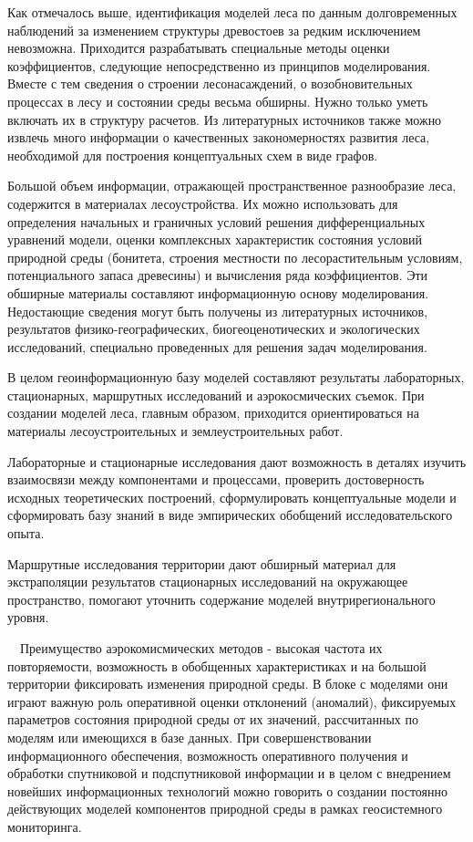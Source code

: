 \documentclass{report}
\begin{document}
Как отмечалось выше, идентификация моделей леса по данным долговременных наблюдений за изменением структуры древостоев
за редким исключением невозможна. Приходится разрабатывать специальные методы оценки коэффициентов, следующие
непосред\-ственно из принципов моделирования. Вместе с тем сведения о строении лесонасаждений, о возобновительных
процессах в лесу и состоянии среды весьма обширны. Нужно только уметь включать их в структуру расчетов. Из литературных
источников также мож\-но извлечь много информации о качественных закономерностях развития леса, необходимой для
построения концептуальных схем в виде графов.

Большой объем информации, отражающей пространственное разнообразие леса, содержится в материалах лесоустройства. Их
можно использовать для определения начальных и граничных условий решения дифференциальных уравнений мо\-дели, оценки
комплексных характеристик состояния условий при\-родной среды (бонитета, строения местности по лесорастительным
условиям, потенциального запаса древесины) и вычисления ряда коэффициентов. Эти обширные материалы составляют
информаци\-онную основу моделирования. Недостающие сведения могут быть получены из литературных источников, результатов
физико-географических, биогеоценотических и экологических исследований, специально проведенных для решения задач
моделирования.

В целом геоинформационную  базу  моделей  составляют  результаты лабораторных,  стационарных,  маршрутных  исследований 
и аэрокосмических  съемок.  При  создании  моделей  леса,  главным образом, приходится ориентироваться на материалы
лесоустроительных и землеустроительных работ.

Лабораторные и стационарные исследования дают  возможность  в деталях  изучить  взаимосвязи  между  компонентами  и 
процессами, проверить  достоверность  исходных  теоретических  построений, сформулировать концептуальные модели и
сформировать базу знаний в виде эмпирических обобщений исследовательского опыта. 

Маршрутные исследования территории дают обширный материал для экстраполяции результатов стационарных исследований на 
окружающее пространство,  помогают  уточнить  содержание  моделей внутрирегионального уровня.

 \ \ Преимущество аэрокомисмических методов - высокая частота  их повторяемости,  возможность  в  обобщенных 
характеристиках  и  на большой территории фиксировать изменения природной среды. В  блоке с моделями они играют важную
роль  оперативной  оценки  отклонений (аномалий),  фиксируемых  параметров  состояния  природной среды от их значений,
рассчитанных по моделям или имеющихся в базе данных.  При  совершенствовании  информационного  обеспечения, возможность
оперативного  получения  и  обработки спутниковой и  подспутниковой  информации  и  в  целом  с  внедрением  новейших
информационных технологий можно говорить о создании постоянно действующих  моделей  компонентов  природной  среды  в 
рамках геосистемного мониторинга.
\end{document}
